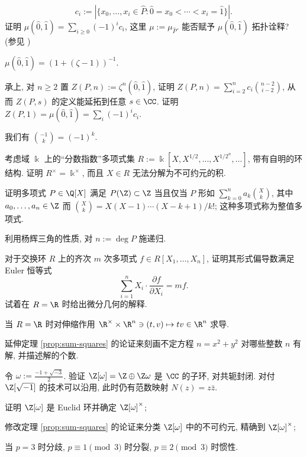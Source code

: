 \begin{Exercises}
		\[ c_i := \left| \{ x_0, \ldots, x_i \in \hat{P} : \hat{0} = x_0 < \cdots < x_i = \hat{1} \} \right|. \]
		证明 $\mu(\hat{0}, \hat{1}) = \sum_{i \geq 0} (-1)^i c_i$, 这里 $\mu := \mu_{\hat{P}}$. 能否赋予 $\mu(\hat{0}, \hat{1})$ 拓扑诠释? (参见 \cite[\S 3.8]{Stan09})
		\begin{hint}
			$\mu(\hat{0}, \hat{1}) = (1 + (\zeta - 1))^{-1}$.
		\end{hint}
	\item 承上, 对 $n \geq 2$ 置 $Z(P,n) := \zeta^n(\hat{0}, \hat{1})$, 证明 $Z(P,n) = \sum_{i=2}^n c_i \binom{n-2}{i-2}$, 从而 $Z(P,s)$ 的定义能延拓到任意 $s \in \CC$. 证明 $Z(P,1) = \mu(\hat{0},\hat{1}) = \sum_i (-1)^i c_i$. \begin{hint} 我们有 $\binom{-1}{k} = (-1)^k$. \end{hint}
	\item 考虑域 $\Bbbk$ 上的``分数指数''多项式集 $R := \Bbbk[X, X^{1/2}, \ldots, X^{1/2^n}, \ldots]$, 带有自明的环结构. 证明 $R^\times = \Bbbk^\times$, 而且 $X \in R$ 无法分解为不可约元的积.
	\item 证明多项式 $P \in \Q[X]$ 满足 $P(\Z) \subset \Z$ 当且仅当 $P$ 形如 $\sum_{k=0}^n a_k \binom{X}{k}$, 其中 $a_0, \ldots, a_n \in \Z$ 而 $\binom{X}{k} = X(X-1) \cdots (X-k+1)/k!$; 这种多项式称为整值多项式. \begin{hint} 利用杨辉三角的性质, 对 $n := \deg P$ 施递归. \end{hint}
	\item 对于交换环 $R$ 上的齐次 $m$ 次多项式 $f \in R[X_1, \ldots, X_n]$, 证明其形式偏导数满足 Euler 恒等式
		\[ \sum_{i=1}^n X_i \cdot \frac{\partial f}{\partial X_i} = m f. \]
		试着在 $R=\R$ 时给出微分几何的解释. \begin{hint} 当 $R=\R$ 时对伸缩作用 $\R^\times \times \R^n \ni (t,v) \mapsto tv \in \R^n$ 求导. \end{hint}
	\item 延伸定理 \ref{prop:sum-squares} 的论证来刻画不定方程 $n = x^2 + y^2$ 对哪些整数 $n$ 有解, 并描述解的个数.
	\item 令 $\omega := \frac{-1 + \sqrt{-3}}{2}$. 验证 $\Z[\omega] = \Z \oplus \Z\omega$ 是 $\CC$ 的子环, 对共轭封闭. 对付 $\Z[\sqrt{-1}]$ 的技术可以沿用, 此时仍有范数映射 $N(z) = z\bar{z}$.
		\begin{compactenum}[(i)]
			\item 证明 $\Z[\omega]$ 是 Euclid 环并确定 $\Z[\omega]^\times$;
			\item 修改定理 \ref{prop:sum-squares} 的论证来分类 $\Z[\omega]$ 中的不可约元, 精确到 $\Z[\omega]^\times$; \begin{hint} 当 $p=3$ 时分歧, $p \equiv 1 \pmod 3$ 时分裂, $p \equiv 2 \pmod 3$ 时惯性. \end{hint}

\end{compactenum}
\end{Exercises}

